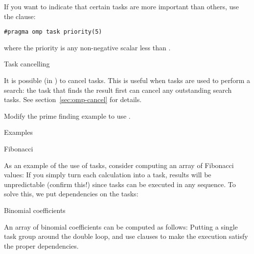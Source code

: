 If you want to indicate that certain tasks are more important
than others, use the  clause:
\begin{lstlisting}
#pragma omp task priority(5)
\end{lstlisting}
where the priority is any non-negative scalar
less than .

 {Task cancelling}

It is possible (in ) to cancel
tasks. This is useful when tasks are used to perform a search: the
task that finds the result first can cancel any outstanding search
tasks.
See section~\ref{sec:omp-cancel} for details.

\begin{exercise}
  Modify the prime finding example to use .
\end{exercise}

 {Examples}

 {Fibonacci}

As an example of the use of tasks, consider computing an array of Fibonacci values:
%
%
If you simply turn each calculation into a task, results will be
unpredictable (confirm this!) since tasks can be executed in any sequence.
To solve this, we put dependencies on the tasks:
%

 {Binomial coefficients}

\begin{exercise}
  An array of binomial coefficients can be computed as follows:
  Putting a single task group around the double loop, and use
   clauses to make the execution satisfy the proper dependencies.
\end{exercise}

